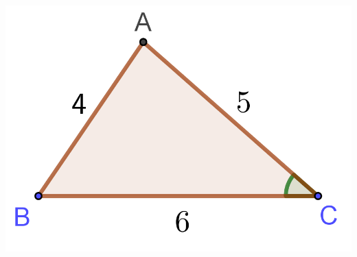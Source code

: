 \documentclass{oblivoir}
\begin{document}
\noindent
\begin{minipage}{.6\textwidth}
%
\label{cos5}
\vspace{30pt}
\mbox{}
\end{minipage}
\begin{minipage}{.4\textwidth}
\centering
\includegraphics[width=.6\textwidth]{cos_5}
\end{minipage}
\end{document}

